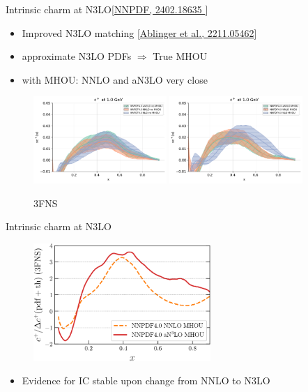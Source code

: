 \documentclass[aspectratio=43, 8pt,t]{beamer}
\begin{document}
\begin{frame}{Intrinsic charm at N3LO}{\color{gray}\footnotesize [\hyperlink{https://arxiv.org/abs/2402.18635 }{NNPDF, 2402.18635 }]}
  \begin{itemize}
    \item Improved N3LO matching {\color{gray}\footnotesize [\hyperlink{https://arxiv.org/abs/2211.05462}{Ablinger et al., 2211.05462}]}
    \item approximate N3LO PDFs $\Rightarrow$ True MHOU
    \item with MHOU: NNLO and aN3LO very close
  \end{itemize}

  \begin{figure}
    \includegraphics[width=0.45\textwidth]{n3lo_charm.pdf}
    \includegraphics[width=0.45\textwidth]{n3lo_charm_mhou.pdf}
    \caption*{3FNS}
  \end{figure}
\end{frame}

\begin{frame}{Intrinsic charm at N3LO}
  \begin{figure}
    \includegraphics[width=0.6\textwidth]{IC-Significance-N3LO.pdf}
  \end{figure}
  \begin{itemize}
    \item Evidence for IC stable upon change from NNLO to N3LO
  \end{itemize}
\end{frame}
\end{document}
